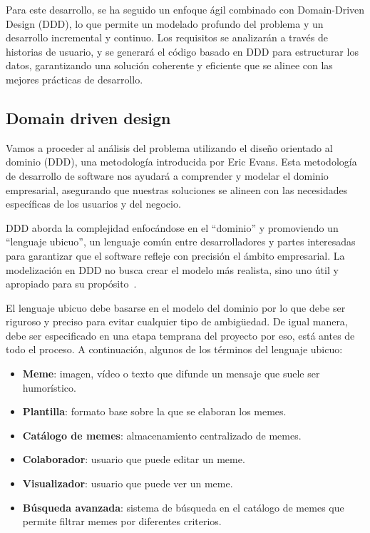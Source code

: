 Para este desarrollo, se ha seguido un enfoque ágil combinado con Domain-Driven Design (DDD), lo que permite un modelado profundo del problema y un desarrollo incremental y continuo. Los requisitos se analizarán a través de historias de usuario, y se generará el código basado en DDD para estructurar los datos, garantizando una solución coherente y eficiente que se alinee con las mejores prácticas de desarrollo.

\subsection{Domain driven design}

Vamos a proceder al análisis del problema utilizando el diseño orientado al dominio (DDD), una metodología introducida por Eric Evans. Esta metodología de desarrollo de software nos ayudará a comprender y modelar el dominio empresarial, asegurando que nuestras soluciones se alineen con las necesidades específicas de los usuarios y del negocio.

DDD aborda la complejidad enfocándose en el ``dominio'' y promoviendo un ``lenguaje ubicuo'', un lenguaje común entre desarrolladores y partes interesadas para garantizar que el software refleje con precisión el ámbito empresarial. La modelización en DDD no busca crear el modelo más realista, sino uno útil y apropiado para su propósito~\cite{evans2004domain}.

El lenguaje ubicuo debe basarse en el modelo del dominio por lo que debe ser riguroso y preciso para evitar cualquier tipo de ambigüedad. De igual manera, debe ser especificado en una etapa temprana del proyecto por eso, está antes de todo el proceso. A continuación, algunos de los términos del lenguaje ubicuo:

\begin{itemize}
    \item \textbf{Meme}: imagen, vídeo o texto que difunde un mensaje que suele ser humorístico.
    \item \textbf{Plantilla}: formato base sobre la que se elaboran los memes.
    \item \textbf{Catálogo de memes}: almacenamiento centralizado de memes.
    \item \textbf{Colaborador}: usuario que puede editar un meme.
    \item \textbf{Visualizador}: usuario que puede ver un meme.
    \item \textbf{Búsqueda avanzada}: sistema de búsqueda en el catálogo de memes que permite filtrar memes por diferentes criterios.
\end{itemize}

